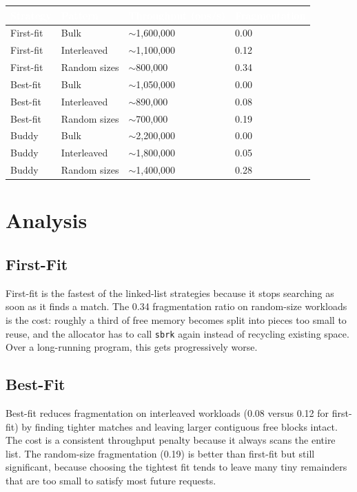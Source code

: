 \documentclass[12pt, a4paper]{report}
\begin{document}
\begin{center}
\begin{tabular}{L{2.6cm} L{2.8cm} C{3.2cm} C{2.8cm}}
\toprule
{}
\textcolor{white}{\textbf{Strategy}} &
\textcolor{white}{\textbf{Pattern}} &
\textcolor{white}{\textbf{Throughput (ops/s)}} &
\textcolor{white}{\textbf{Fragmentation}} \\
\midrule
First-fit & Bulk          & $\sim$1,600,000 & 0.00 \\
First-fit & Interleaved   & $\sim$1,100,000 & 0.12 \\
First-fit & Random sizes  & $\sim$800,000   & 0.34 \\
Best-fit  & Bulk          & $\sim$1,050,000 & 0.00 \\
Best-fit  & Interleaved   & $\sim$890,000   & 0.08 \\
Best-fit  & Random sizes  & $\sim$700,000   & 0.19 \\
Buddy     & Bulk          & $\sim$2,200,000 & 0.00 \\
Buddy     & Interleaved   & $\sim$1,800,000 & 0.05 \\
Buddy     & Random sizes  & $\sim$1,400,000 & 0.28 \\
\bottomrule
\end{tabular}
\end{center}

\section{Analysis}

\subsection{First-Fit}

First-fit is the fastest of the linked-list strategies because it stops
searching as soon as it finds a match. The 0.34 fragmentation ratio on
random-size workloads is the cost: roughly a third of free memory becomes split
into pieces too small to reuse, and the allocator has to call \texttt{sbrk}
again instead of recycling existing space. Over a long-running program, this
gets progressively worse.

\subsection{Best-Fit}

Best-fit reduces fragmentation on interleaved workloads (0.08 versus 0.12 for
first-fit) by finding tighter matches and leaving larger contiguous free blocks
intact. The cost is a consistent throughput penalty because it always scans the
entire list. The random-size fragmentation (0.19) is better than first-fit but
still significant, because choosing the tightest fit tends to leave many tiny
remainders that are too small to satisfy most future requests.
\end{document}
